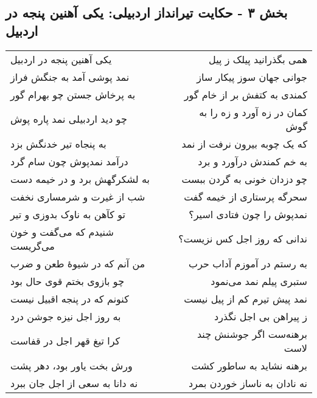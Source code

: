 \begin{center}
\section*{بخش ۳ - حکایت تیرانداز اردبیلی: یکی آهنین پنجه در اردبیل}
\label{sec:003}
\begin{longtable}{l p{0.5cm} r}
یکی آهنین پنجه در اردبیل
&&
همی بگذرانید پیلک ز پیل
\\
نمد پوشی آمد به جنگش فراز
&&
جوانی جهان سوز پیکار ساز
\\
به پرخاش جستن چو بهرام گور
&&
کمندی به کتفش بر از خام گور
\\
چو دید اردبیلی نمد پاره پوش
&&
کمان در زه آورد و زه را به گوش
\\
به پنجاه تیر خدنگش بزد
&&
که یک چوبه بیرون نرفت از نمد
\\
درآمد نمدپوش چون سام گرد
&&
به خم کمندش درآورد و برد
\\
به لشکرگهش برد و در خیمه دست
&&
چو دزدان خونی به گردن ببست
\\
شب از غیرت و شرمساری نخفت
&&
سحرگه پرستاری از خیمه گفت
\\
تو کآهن به ناوک بدوزی و تیر
&&
نمدپوش را چون فتادی اسیر؟
\\
شنیدم که می‌گفت و خون می‌گریست
&&
ندانی که روز اجل کس نزیست؟
\\
من آنم که در شیوهٔ طعن و ضرب
&&
به رستم در آموزم آداب حرب
\\
چو بازوی بختم قوی حال بود
&&
ستبری پیلم نمد می‌نمود
\\
کنونم که در پنجه اقبیل نیست
&&
نمد پیش تیرم کم از پیل نیست
\\
به روز اجل نیزه جوشن درد
&&
ز پیراهن بی اجل نگذرد
\\
کرا تیغ قهر اجل در قفاست
&&
برهنه‌ست اگر جوشنش چند لاست
\\
ورش بخت یاور بود، دهر پشت
&&
برهنه نشاید به ساطور کشت
\\
نه دانا به سعی از اجل جان ببرد
&&
نه نادان به ناساز خوردن بمرد
\\
\end{longtable}
\end{center}
